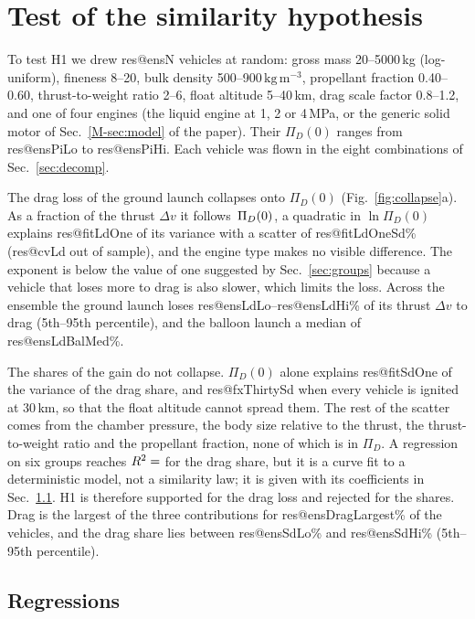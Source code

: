 \documentclass[11pt,a4paper]{article}
\makeatletter
\newcommand{\R}[1]{\csname res@#1\endcsname}
\newcommand{\kgm}{\,\mathrm{kg\,m^{-3}}}
\makeatother
\begin{document}
\section{Test of the similarity hypothesis}
\label{sec:collapse}

To test H1 we drew \R{ensN} vehicles at random: gross mass 20--5000\,kg (log-uniform), fineness 8--20, bulk density 500--900$\kgm$, propellant fraction 0.40--0.60, thrust-to-weight ratio 2--6, float altitude 5--40\,km, drag scale factor 0.8--1.2, and one of four engines (the liquid engine at 1, 2 or 4\,MPa, or the generic solid motor of Sec.~\ref{M-sec:model} of the paper). Their $\Pi_D(0)$ ranges from \R{ensPiLo} to \R{ensPiHi}. Each vehicle was flown in the eight combinations of Sec.~\ref{sec:decomp}.

The drag loss of the ground launch collapses onto $\Pi_D(0)$ (Fig.~\ref{fig:collapse}a). As a fraction of the thrust $\Delta v$ it follows $\R{ldCoef}\,\Pi_D(0)^{\R{ldSlope}}$, a quadratic in $\ln\Pi_D(0)$ explains \R{fitLdOne} of its variance with a scatter of \R{fitLdOneSd}\% (\R{cvLd} out of sample), and the engine type makes no visible difference. The exponent is below the value of one suggested by Sec.~\ref{sec:groups} because a vehicle that loses more to drag is also slower, which limits the loss. Across the ensemble the ground launch loses \R{ensLdLo}--\R{ensLdHi}\% of its thrust $\Delta v$ to drag (5th--95th percentile), and the balloon launch a median of \R{ensLdBalMed}\%.

The shares of the gain do not collapse. $\Pi_D(0)$ alone explains \R{fitSdOne} of the variance of the drag share, and \R{fxThirtySd} when every vehicle is ignited at 30\,km, so that the float altitude cannot spread them. The rest of the scatter comes from the chamber pressure, the body size relative to the thrust, the thrust-to-weight ratio and the propellant fraction, none of which is in $\Pi_D$. A regression on six groups reaches $R^2=\R{fitSdFull}$ for the drag share, but it is a curve fit to a deterministic model, not a similarity law; it is given with its coefficients in Sec.~\ref{app:similarity}. H1 is therefore supported for the drag loss and rejected for the shares. Drag is the largest of the three contributions for \R{ensDragLargest}\% of the vehicles, and the drag share lies between \R{ensSdLo}\% and \R{ensSdHi}\% (5th--95th percentile).

\subsection{Regressions}
\label{app:similarity}
\end{document}
